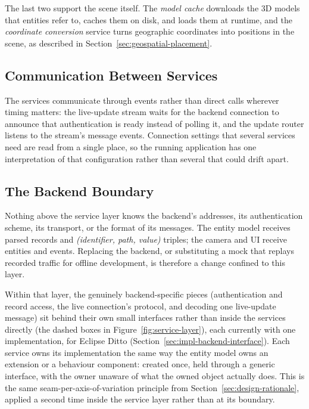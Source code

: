 The last two support the scene itself. The \emph{model cache} downloads the 3D models that entities refer to, caches them on disk, and loads them at runtime, and the \emph{coordinate conversion} service turns geographic coordinates into positions in the scene, as described in Section~\ref{sec:geospatial-placement}.

\subsection{Communication Between Services}

The services communicate through events rather than direct calls wherever timing matters: the live-update stream waits for the backend connection to announce that authentication is ready instead of polling it, and the update router listens to the stream's message events. Connection settings that several services need are read from a single place, so the running application has one interpretation of that configuration rather than several that could drift apart.

\subsection{The Backend Boundary}

Nothing above the service layer knows the backend's addresses, its authentication scheme, its transport, or the format of its messages. The entity model receives parsed records and \emph{(identifier, path, value)} triples; the camera and UI receive entities and events. Replacing the backend, or substituting a mock that replays recorded traffic for offline development, is therefore a change confined to this layer.

Within that layer, the genuinely backend-specific pieces (authentication and record access, the live connection's protocol, and decoding one live-update message) sit behind their own small interfaces rather than inside the services directly (the dashed boxes in Figure~\ref{fig:service-layer}), each currently with one implementation, for Eclipse Ditto (Section~\ref{sec:impl-backend-interface}). Each service owns its implementation the same way the entity model owns an extension or a behaviour component: created once, held through a generic interface, with the owner unaware of what the owned object actually does. This is the same seam-per-axis-of-variation principle from Section~\ref{sec:design-rationale}, applied a second time inside the service layer rather than at its boundary.


